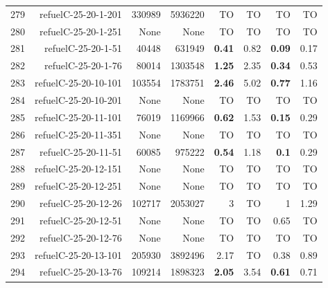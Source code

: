 \begin{longtable}{lrr@{\hskip 12pt}r@{\hskip 12pt}r@{\hskip 12pt}r@{\hskip 12pt}r@{\hskip 12pt}r}
279 & \multirow{1}{*}{refuelC-25-20-1-201} & \multirow{1}{*}{330989} & \multirow{1}{*}{5936220} & TO & TO & TO & TO \\
280 & \multirow{1}{*}{refuelC-25-20-1-251} & \multirow{1}{*}{None} & \multirow{1}{*}{None} & TO & TO & TO & TO \\
281 & \multirow{1}{*}{refuelC-25-20-1-51} & \multirow{1}{*}{40448} & \multirow{1}{*}{631949} & \textbf{0.41} & 0.82 & \textbf{0.09} & 0.17 \\
282 & \multirow{1}{*}{refuelC-25-20-1-76} & \multirow{1}{*}{80014} & \multirow{1}{*}{1303548} & \textbf{1.25} & 2.35 & \textbf{0.34} & 0.53 \\
283 & \multirow{1}{*}{refuelC-25-20-10-101} & \multirow{1}{*}{103554} & \multirow{1}{*}{1783751} & \textbf{2.46} & 5.02 & \textbf{0.77} & 1.16 \\
284 & \multirow{1}{*}{refuelC-25-20-10-201} & \multirow{1}{*}{None} & \multirow{1}{*}{None} & TO & TO & TO & TO \\
285 & \multirow{1}{*}{refuelC-25-20-11-101} & \multirow{1}{*}{76019} & \multirow{1}{*}{1169966} & \textbf{0.62} & 1.53 & \textbf{0.15} & 0.29 \\
286 & \multirow{1}{*}{refuelC-25-20-11-351} & \multirow{1}{*}{None} & \multirow{1}{*}{None} & TO & TO & TO & TO \\
287 & \multirow{1}{*}{refuelC-25-20-11-51} & \multirow{1}{*}{60085} & \multirow{1}{*}{975222} & \textbf{0.54} & 1.18 & \textbf{0.1} & 0.29 \\
288 & \multirow{1}{*}{refuelC-25-20-12-151} & \multirow{1}{*}{None} & \multirow{1}{*}{None} & TO & TO & TO & TO \\
289 & \multirow{1}{*}{refuelC-25-20-12-251} & \multirow{1}{*}{None} & \multirow{1}{*}{None} & TO & TO & TO & TO \\
290 & \multirow{1}{*}{refuelC-25-20-12-26} & \multirow{1}{*}{102717} & \multirow{1}{*}{2053027} & 3 & TO & 1 & 1.29 \\
291 & \multirow{1}{*}{refuelC-25-20-12-51} & \multirow{1}{*}{None} & \multirow{1}{*}{None} & TO & TO & 0.65 & TO \\
292 & \multirow{1}{*}{refuelC-25-20-12-76} & \multirow{1}{*}{None} & \multirow{1}{*}{None} & TO & TO & TO & TO \\
293 & \multirow{1}{*}{refuelC-25-20-13-101} & \multirow{1}{*}{205930} & \multirow{1}{*}{3892496} & 2.17 & TO & 0.38 & 0.89 \\
294 & \multirow{1}{*}{refuelC-25-20-13-76} & \multirow{1}{*}{109214} & \multirow{1}{*}{1898323} & \textbf{2.05} & 3.54 & \textbf{0.61} & 0.71 \\

\end{longtable}
